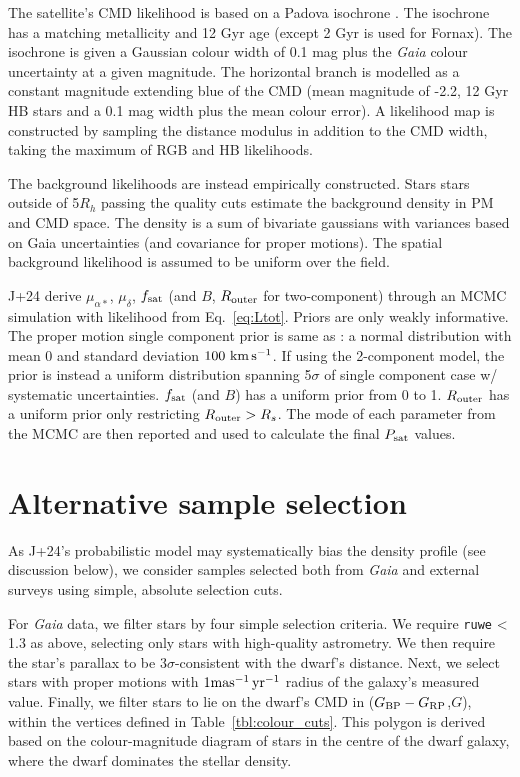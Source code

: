 The satellite's CMD likelihood is based on a Padova isochrone
\citep{girardi+2002}. The isochrone has a matching metallicity and 12
Gyr age (except 2 Gyr is used for Fornax). The isochrone is given a
Gaussian colour width of 0.1 mag plus the \emph{Gaia} colour uncertainty
at a given magnitude. The horizontal branch is modelled as a constant
magnitude extending blue of the CMD (mean magnitude of -2.2, 12 Gyr HB
stars and a 0.1 mag width plus the mean colour error). A likelihood map
is constructed by sampling the distance modulus in addition to the CMD
width, taking the maximum of RGB and HB likelihoods.

The background likelihoods are instead empirically constructed. Stars
stars outside of 5\(R_h\) passing the quality cuts estimate the
background density in PM and CMD space. The density is a sum of
bivariate gaussians with variances based on Gaia uncertainties (and
covariance for proper motions). The spatial background likelihood is
assumed to be uniform over the field.

J+24 derive \(\mu_{\alpha*}\), \(\mu_\delta\), \(f_{\rm sat}\) (and
\(B\), \(R_{\rm outer}\) for two-component) through an MCMC simulation
with likelihood from Eq.~\ref{eq:Ltot}. Priors are only weakly
informative. The proper motion single component prior is same as
\citet{MV2020a}: a normal distribution with mean 0 and standard
deviation \(100\ {\rm km\,s^{-1}}\). If using the 2-component model, the prior is
instead a uniform distribution spanning 5\(\sigma\) of single component
case w/ systematic uncertainties. \(f_{\rm sat}\) (and \(B\)) has a
uniform prior from 0 to 1. \(R_{\rm outer}\) has a uniform prior only
restricting \(R_{\rm outer} > R_s\). The mode of each parameter from the
MCMC are then reported and used to calculate the final \(P_{\rm sat}\)
values.

\section{Alternative sample selection}\label{sec:simple_selection}

As J+24's probabilistic model may systematically bias the density
profile (see discussion below), we consider samples selected both from
\emph{Gaia} and external surveys using simple, absolute selection cuts.

For \emph{Gaia} data, we filter stars by four simple selection criteria.
We require \texttt{ruwe} \textless{} 1.3 as above, selecting only stars
with high-quality astrometry. We then require the star's parallax to be
\(3\sigma\)-consistent with the dwarf's distance. Next, we select stars
with proper motions with \(1{\rm mas^{-1}\,yr^{-1}}\)\hspace{0pt} radius of the galaxy's
measured value. Finally, we filter stars to lie on the dwarf's CMD in
(\(G_{\rm BP} - G_{\rm RP}\),\(G\)), within the vertices defined in
Table~\ref{tbl:colour_cuts}. This polygon is derived based on the
colour-magnitude diagram of stars in the centre of the dwarf galaxy,
where the dwarf dominates the stellar density.

